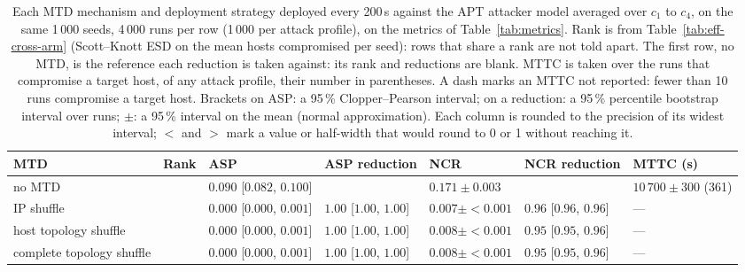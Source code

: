 \begin{table}[H]
  \centering
  \caption[Every metric for the APT attacker model, with 95\,\% intervals]{Each MTD mechanism and deployment strategy deployed every 200\,s against the APT attacker model averaged over $c_1$ to $c_4$, on the same 1\,000 seeds, 4\,000 runs per row (1\,000 per attack profile), on the metrics of Table~\ref{tab:metrics}. Rank is from Table~\ref{tab:eff-cross-arm} (Scott--Knott ESD on the mean hosts compromised per seed): rows that share a rank are not told apart. The first row, no MTD, is the reference each reduction is taken against: its rank and reductions are blank. MTTC is taken over the runs that compromise a target host, of any attack profile, their number in parentheses. A dash marks an MTTC not reported: fewer than 10 runs compromise a target host. Brackets on ASP: a 95\,\% Clopper--Pearson interval; on a reduction: a 95\,\% percentile bootstrap interval over runs; $\pm$: a 95\,\% interval on the mean (normal approximation). Each column is rounded to the precision of its widest interval; $<$ and $>$ mark a value or half-width that would round to 0 or 1 without reaching it.}
  \label{tab:full-movement}
  \tablestyle
  \begin{tabular}{@{}P{4.7cm}>{\centering\arraybackslash}p{0.9cm}>{\centering\arraybackslash}p{4.0cm}>{\centering\arraybackslash}p{3.2cm}>{\centering\arraybackslash}p{2.6cm}>{\centering\arraybackslash}p{3.2cm}>{\centering\arraybackslash}p{3.2cm}@{}}
    \toprule
    MTD & Rank & ASP & ASP reduction & NCR & NCR reduction & MTTC (s) \\
    \midrule
    no MTD &  & $0.090$ [$0.082$, $0.100$] &  & $0.171 \pm 0.003$ &  & $10\,700 \pm 300$ (361) \\
    \midrule
    IP shuffle & 1 & $0.000$ [$0.000$, $0.001$] & $1.00$ [$1.00$, $1.00$] & $0.007 \pm {<}0.001$ & $0.96$ [$0.96$, $0.96$] & --- \\
    host topology shuffle & 1 & $0.000$ [$0.000$, $0.001$] & $1.00$ [$1.00$, $1.00$] & $0.008 \pm {<}0.001$ & $0.95$ [$0.95$, $0.96$] & --- \\
    complete topology shuffle & 1 & $0.000$ [$0.000$, $0.001$] & $1.00$ [$1.00$, $1.00$] & $0.008 \pm {<}0.001$ & $0.95$ [$0.95$, $0.96$] & --- \\

\end{tabular}
\end{table}
